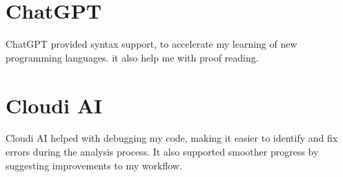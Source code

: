 \documentclass[
  a4paper,
  openany]{scrbook}
\begin{document}
\section{ChatGPT}\label{chatgpt}

ChatGPT provided syntax support, to accelerate my learning of new
programming languages. it also help me with proof reading.

\section{Cloudi AI}\label{cloudi-ai}

Cloudi AI helped with debugging my code, making it easier to identify
and fix errors during the analysis process. It also supported smoother
progress by suggesting improvements to my workflow.
\end{document}
